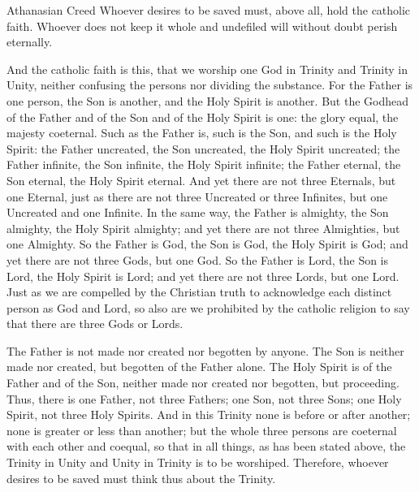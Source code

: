 Athanasian Creed
Whoever desires to be saved must, above all, hold the catholic faith. Whoever does not 
keep it whole and undefiled will without doubt perish eternally. 
 
And the catholic faith is this, that we worship one God in Trinity and Trinity in Unity, neither 
confusing the persons nor dividing the substance. For the Father is one person, the Son is 
another, and the Holy Spirit is another. But the Godhead of the Father and of the Son and of 
the Holy Spirit is one: the glory equal, the majesty coeternal. Such as the Father is, such is 
the Son, and such is the Holy Spirit: the Father uncreated, the Son uncreated, the Holy Spirit 
uncreated; the Father infinite, the Son infinite, the Holy Spirit infinite; the Father eternal, 
the Son eternal, the Holy Spirit eternal. And yet there are not three Eternals, but one 
Eternal, just as there are not three Uncreated or three Infinites, but one Uncreated and one 
Infinite. In the same way, the Father is almighty, the Son almighty, the Holy Spirit almighty; 
and yet there are not three Almighties, but one Almighty. So the Father is God, the Son is 
God, the Holy Spirit is God; and yet there are not three Gods, but one God. So the Father is 
Lord, the Son is Lord, the Holy Spirit is Lord; and yet there are not three Lords, but one Lord. 
Just as we are compelled by the Christian truth to acknowledge each distinct person as God 
and Lord, so also are we prohibited by the catholic religion to say that there are three Gods 
or Lords. 
 
The Father is not made nor created nor begotten by anyone. The Son is neither made nor 
created, but begotten of the Father alone. The Holy Spirit is of the Father and of the Son, 
neither made nor created nor begotten, but proceeding. Thus, there is one Father, not three 
Fathers; one Son, not three Sons; one Holy Spirit, not three Holy Spirits. And in this Trinity 
none is before or after another; none is greater or less than another; but the whole three 
persons are coeternal with each other and coequal, so that in all things, as has been stated 
above, the Trinity in Unity and Unity in Trinity is to be worshiped. Therefore, whoever 
desires to be saved must think thus about the Trinity. 
 

